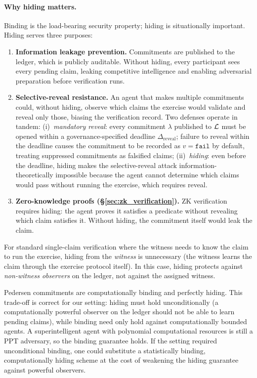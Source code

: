 \paragraph{Why hiding matters.}
Binding is the load-bearing security property; hiding is
situationally important.  Hiding serves three purposes:
\begin{enumerate}
    \item \textbf{Information leakage prevention.} Commitments are
    published to the ledger, which is publicly auditable.  Without
    hiding, every participant sees every pending claim, leaking
    competitive intelligence and enabling adversarial preparation
    before verification runs.
    \item \textbf{Selective-reveal resistance.} An agent that makes
    multiple commitments could, without hiding, observe which claims
    the exercise would validate and reveal only those, biasing the
    verification record.  Two defenses operate in tandem:
    (i)~\emph{mandatory reveal}: every commitment $\lambda$ published
    to $\mathcal{L}$ must be opened within a governance-specified deadline
    $\Delta_{\mathrm{reveal}}$; failure to reveal within the deadline
    causes the commitment to be recorded as $v = \texttt{fail}$ by
    default, treating suppressed commitments as falsified claims;
    (ii)~\emph{hiding}: even before the deadline, hiding makes the
    selective-reveal attack information-theoretically impossible
    because the agent cannot determine which claims would pass without
    running the exercise, which requires reveal.
    \item \textbf{Zero-knowledge proofs
    (\S\ref{sec:zk_verification}).}  ZK verification requires
    hiding: the agent proves it satisfies a predicate without
    revealing which claim satisfies it.  Without hiding, the
    commitment itself would leak the claim.
\end{enumerate}
For standard single-claim verification where the witness needs to
know the claim to run the exercise, hiding from the \emph{witness}
is unnecessary (the witness learns the claim through the exercise
protocol itself).  In this case, hiding protects against
\emph{non-witness observers} on the ledger, not against the
assigned witness.

\begin{remark}
Pedersen commitments are computationally binding and perfectly
hiding.  This trade-off is correct for our setting: hiding must
hold unconditionally (a computationally powerful observer on the
ledger should not be able to learn pending claims), while binding
need only hold against computationally bounded agents.  A
superintelligent agent with polynomial computational resources is
still a PPT adversary, so the binding guarantee holds.  If the
setting required unconditional binding, one could substitute a
statistically binding, computationally hiding scheme at the cost of
weakening the hiding guarantee against powerful observers.
\end{remark}

